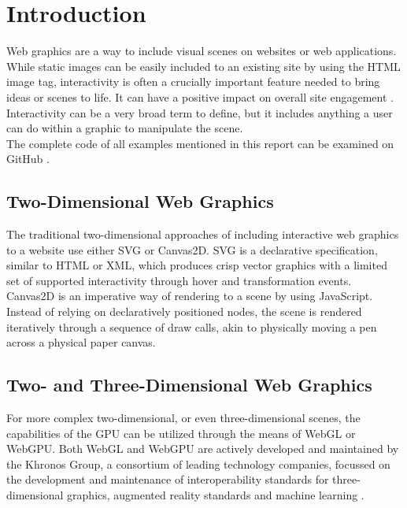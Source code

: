 %
%
% 
% 


\chapter{Introduction}

\label{chap:Intro}
Web graphics are a way to include visual scenes on websites or web applications.
While static images can be easily included to an existing site by using the HTML image tag,
interactivity is often a crucially important feature needed to bring ideas or scenes to life.
It can have a positive impact on overall site engagement \parencite{web-engagement-literature}.
Interactivity can be a very broad term to define, but it includes anything a user can do within
a graphic to manipulate the scene. \\

The complete code of all examples mentioned in this report can be examined on GitHub \parencite{github-repo}.

\section{Two-Dimensional Web Graphics}
The traditional two-dimensional approaches of including interactive
web graphics to a website use either SVG or Canvas2D.
SVG is a declarative specification, similar to HTML or XML, which produces crisp vector
graphics with a limited set of supported interactivity through hover and transformation events.
Canvas2D is an imperative way of rendering to a scene by using JavaScript.
Instead of relying on declaratively positioned nodes, the scene is rendered iteratively
through a sequence of draw calls, akin to physically moving a pen across a physical paper canvas.

\section{Two- and Three-Dimensional Web Graphics}
For more complex two-dimensional, or even three-dimensional scenes,
the capabilities of the GPU can be utilized through the means of WebGL or WebGPU.
Both WebGL and WebGPU are actively developed and maintained by the Khronos Group, a consortium
of leading technology companies, focussed on the development and maintenance of
interoperability standards for three-dimensional graphics, augmented reality standards and
machine learning \parencite{khronos-web}.

